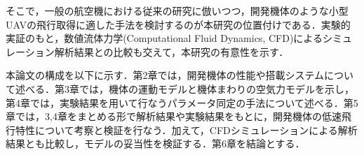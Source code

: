 そこで，一般の航空機における従来の研究に倣いつつ，開発機体のような小型UAVの飛行取得に適した手法を検討するのが本研究の位置付けである．実験的実証のもと，数値流体力学(Computational Fluid Dynamics, CFD)によるシミュレーション解析結果との比較も交えて，本研究の有意性を示す．

本論文の構成を以下に示す．第2章では，開発機体の性能や搭載システムについて述べる．第3章では，機体の運動モデルと機体まわりの空気力モデルを示し，第4章では，実験結果を用いて行なうパラメータ同定の手法について述べる．第5章では，3,4章をまとめる形で解析結果や実験結果をもとに，開発機体の低速飛行特性について考察と検証を行なう．加えて，CFDシミュレーションによる解析結果とも比較し，モデルの妥当性を検証する．第6章を結論とする．
